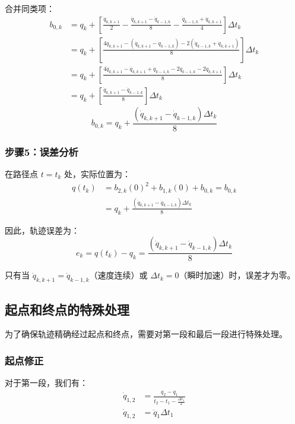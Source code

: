 \documentclass[12pt,a4paper]{article}
\begin{document}
合并同类项：
\begin{align*}
b_{0,k} &= q_k + \left[ \frac{\dot{q}_{k,k+1}}{2} - \frac{\dot{q}_{k,k+1} - \dot{q}_{k-1,k}}{8} - \frac{\dot{q}_{k-1,k} + \dot{q}_{k,k+1}}{4} \right] \Delta t_k \\
&= q_k + \left[ \frac{4\dot{q}_{k,k+1} - (\dot{q}_{k,k+1} - \dot{q}_{k-1,k}) - 2(\dot{q}_{k-1,k} + \dot{q}_{k,k+1})}{8} \right] \Delta t_k \\
&= q_k + \left[ \frac{4\dot{q}_{k,k+1} - \dot{q}_{k,k+1} + \dot{q}_{k-1,k} - 2\dot{q}_{k-1,k} - 2\dot{q}_{k,k+1}}{8} \right] \Delta t_k \\
&= q_k + \left[ \frac{\dot{q}_{k,k+1} - \dot{q}_{k-1,k}}{8} \right] \Delta t_k
\end{align*}
\begin{equation}
\boxed{
b_{0,k} = q_k + \frac{(\dot{q}_{k,k+1} - \dot{q}_{k-1,k})\Delta t_k}{8}
}
\label{eq:b0}
\end{equation}

\subsubsection{步骤5：误差分析}

在路径点 $t = t_k$ 处，实际位置为：
\begin{align*}
q(t_k) &= b_{2,k}(0)^2 + b_{1,k}(0) + b_{0,k} = b_{0,k} \\
&= q_k + \frac{(\dot{q}_{k,k+1} - \dot{q}_{k-1,k})\Delta t_k}{8}
\end{align*}

因此，轨迹误差为：
\begin{equation}
\boxed{
e_k = q(t_k) - q_k = \frac{(\dot{q}_{k,k+1} - \dot{q}_{k-1,k})\Delta t_k}{8}
}
\label{eq:error}
\end{equation}

只有当 $\dot{q}_{k,k+1} = \dot{q}_{k-1,k}$（速度连续）或 $\Delta t_k = 0$（瞬时加速）时，误差才为零。

\subsection{起点和终点的特殊处理}

为了确保轨迹精确经过起点和终点，需要对第一段和最后一段进行特殊处理。

\subsubsection{起点修正}

对于第一段，我们有：
\begin{align*}
    \dot{q}_{1,2} &= \frac{q_2 - q_1}{t_2 - t_1 - \frac{\Delta t_1}{2}} \\
    \dot{q}_{1,2} &= \ddot{q}_1 \Delta t_1
\end{align*}
\end{document}

